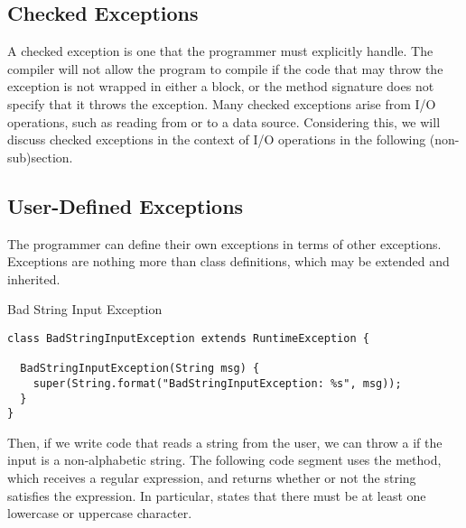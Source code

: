\subsection{Checked Exceptions}

A checked exception is one that the programmer must explicitly handle. The compiler will not allow the program to compile if the code that may throw the exception is not wrapped in either a  block, or the method signature does not specify that it throws the exception. Many checked exceptions arise from I/O operations, such as reading from or to a data source. Considering this, we will discuss checked exceptions in the context of I/O operations in the following (non-sub)section.

\subsection{User-Defined Exceptions}
The programmer can define their own exceptions in terms of other exceptions. Exceptions are nothing more than class definitions, which may be extended and inherited. 


\begin{cl}[]{Bad String Input Exception}
\begin{lstlisting}[language=MyJava]
class BadStringInputException extends RuntimeException {
  
  BadStringInputException(String msg) {
    super(String.format("BadStringInputException: %s", msg));
  }
}
\end{lstlisting}
\end{cl}

Then, if we write code that reads a string from the user, we can throw a  if the input is a non-alphabetic string. The following code segment uses the  method, which receives a regular expression, and returns whether or not the string satisfies the expression. In particular, \ttt{[a-zA-Z]+} states that there must be at least one lowercase or uppercase character.

